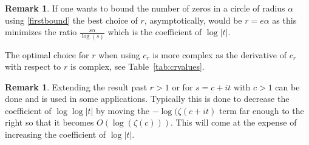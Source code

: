 \documentclass[10pt,english,letter, reqno]{amsart}
\theoremstyle{plain}
\theoremstyle{definition}
\newtheorem{remark}[theorem]{Remark}
\begin{document}
    
\begin{remark}
If one wants to bound the number of zeros in a circle of radius $\alpha$ using \eqref{firstbound} the best choice of $r$, asymptotically, would be $r=e\alpha$ as this minimizes the ratio $\frac{s\alpha}{\log(s)}$ which is the coefficient of $\log|t|$.

The optimal choice for $r$ when using $c_r$ is more complex as the derivative of $c_r$ with respect to $r$ is complex, see Table~\ref{tab:crvalues}.
\end{remark}

\begin{remark}
Extending the result past $r>1$ or for $s=c+it$ with $c>1$ can be done and is used in some applications. Typically this is done to decrease the coefficient of $\log\log|t|$ by moving the $-\log(\zeta(c+it)$ term far enough to the right so that it becomes $O(\log(\zeta(c)))$. This will come at the expense of increasing the coefficient of $\log|t|$. 
\end{remark}
\end{document}
